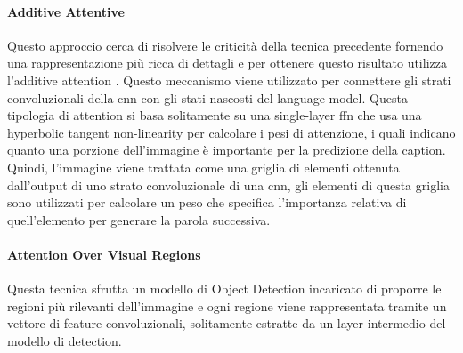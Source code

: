 \paragraph{Additive Attentive}
Questo approccio cerca di risolvere le criticità della tecnica precedente fornendo una rappresentazione più ricca di dettagli e per ottenere questo risultato utilizza l'additive attention \cite{bahdanau2014neural, stefanini2021show}.
Questo meccanismo viene utilizzato per connettere gli strati convoluzionali della \acrshort{cnn} con gli stati nascosti del language model. Questa tipologia di attention si basa solitamente su una single-layer \acrshort{ffn} che usa una hyperbolic tangent non-linearity per calcolare i pesi di attenzione, i quali indicano quanto una porzione dell'immagine è importante per la predizione della caption.
Quindi, l'immagine viene trattata come una griglia di elementi ottenuta dall'output di uno strato convoluzionale di una \acrshort{cnn}, gli elementi di questa griglia sono utilizzati per calcolare un peso che specifica l'importanza relativa di quell'elemento per generare la parola successiva.

\paragraph{Attention Over Visual Regions}
Questa tecnica sfrutta un modello di Object Detection incaricato di proporre le regioni più rilevanti dell'immagine e ogni regione viene rappresentata tramite un vettore di feature convoluzionali, solitamente estratte da un layer intermedio del modello di detection.
